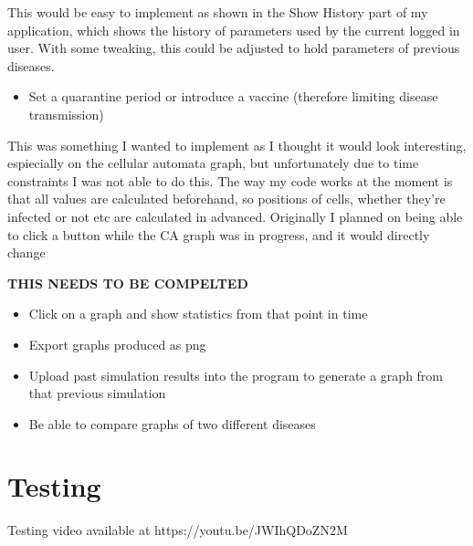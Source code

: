 \documentclass[11pt, a4paper]{article}
\begin{document}
This would be easy to implement as shown in the Show History part of my application, which shows the history of parameters used by the current logged in user. With some tweaking, this could be adjusted to hold parameters of previous diseases.

\begin{itemize}
    \item Set a quarantine period or introduce a vaccine (therefore limiting disease transmission)
\end{itemize}
This was something I wanted to implement as I thought it would look interesting, espiecially on the cellular automata graph, but unfortunately due to time constraints I was not able to do this. The way my code works at the moment is that all values are calculated beforehand, so positions of cells, whether they're infected or not etc are calculated in advanced. Originally I planned on being able to click a button while the CA graph was in progress, and it would directly change 

\textbf{THIS NEEDS TO BE COMPELTED}

\begin{itemize}
    
    \item Click on a graph and show statistics from that point in time
    \item Export graphs produced as png
    \item Upload past simulation results into the program to generate a graph from that previous simulation
    \item Be able to compare graphs of two different diseases
\end{itemize}

\section{Testing}
Testing video available at https://youtu.be/JWIhQDoZN2M


% 
\end{document}
